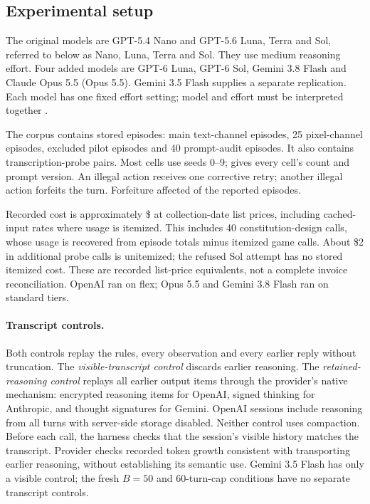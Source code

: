 \subsection{Experimental setup}\label{sec:setup}

The original models are GPT-5.4 Nano and GPT-5.6 Luna, Terra and Sol, referred to below as Nano, Luna, Terra and Sol. They use medium reasoning effort. Four added models are GPT-6 Luna, GPT-6 Sol, Gemini 3.8 Flash and Claude Opus 5.5 (Opus 5.5). Gemini 3.5 Flash supplies a separate replication. Each model has one fixed effort setting; model and effort must be interpreted together \citep{blindboard2026}.

The corpus contains \relaystoredepisodes{} stored episodes: \relayprintedepisodes{} main text-channel episodes, 25 pixel-channel episodes, \relayrefusedepisodes{} excluded pilot episodes and 40 prompt-audit episodes. It also contains \relayprobepairs{} transcription-probe pairs. Most cells use seeds 0--9;  gives every cell's count and prompt version. An illegal action receives one corrective retry; another illegal action forfeits the turn. Forfeiture affected \relayforfeitepisodes{} of the reported episodes.

Recorded cost is approximately \$\relaycostlist{} at collection-date list prices, including cached-input rates where usage is itemized. This includes 40 constitution-design calls, whose usage is recovered from episode totals minus itemized game calls. About \$2 in additional probe calls is unitemized; the refused Sol attempt has no stored itemized cost. These are recorded list-price equivalents, not a complete invoice reconciliation. OpenAI ran on flex; Opus 5.5 and Gemini 3.8 Flash ran on standard tiers.

\paragraph{Transcript controls.}
Both controls replay the rules, every observation and every earlier reply without truncation. The \emph{visible-transcript control} discards earlier reasoning. The \emph{retained-reasoning control} replays all earlier output items through the provider's native mechanism: encrypted reasoning items for OpenAI, signed thinking for Anthropic, and thought signatures for Gemini. OpenAI sessions include reasoning from all turns with server-side storage disabled. Neither control uses compaction. Before each call, the harness checks that the session's visible history matches the transcript. Provider checks recorded token growth consistent with transporting earlier reasoning, without establishing its semantic use. Gemini 3.5 Flash has only a visible control; the fresh $B{=}50$ and 60-turn-cap conditions have no separate transcript controls.

